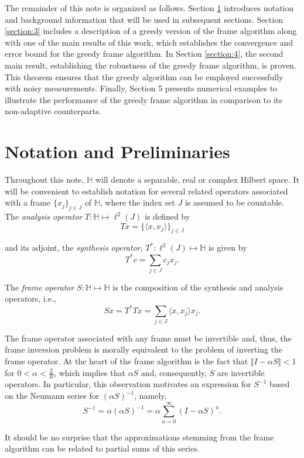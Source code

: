 \documentclass[11pt]{amsart}
\numberwithin{Theorem}{section}
\theoremstyle{definition}
\begin{document}
The remainder of this note is organized as follows.  Section \ref{section:2} introduces notation and background information that will be used in subsequent sections.  Section \ref{section:3} includes a description of a greedy version of the frame algorithm along with one of the main results of this work, which establishes the convergence and error bound for the greedy frame algorithm.  In Section \ref{section:4}, the second main result, establishing the robustness of the greedy frame algorithm, is proven.  This theorem ensures that the greedy algorithm can be employed successfully with noisy measurements.  Finally, Section 5 presents numerical examples to illustrate the performance of the greedy frame algorithm in comparison to its non-adaptive counterparts.


\section{Notation and Preliminaries} \label{section:2}

Throughout this note, $\mathbb{H}$ will denote a separable, real or complex Hilbert space.  It will be convenient to establish notation for several related operators associated with a frame $\lbrace x_{j} \rbrace_{j\in J}$ of $\mathbb{H}$, where the index set $J$ is assumed to be countable.  The \emph{analysis operator} $T:\mathbb{H} \mapsto \ell^{2}(J)$ is defined by
$$ Tx = \lbrace \langle x,x_{j}\rangle \rbrace_{j\in J}$$

\noindent
and its adjoint, the \emph{synthesis operator}, $T^{*}:\ell^{2}(J) \mapsto \mathbb{H}$ is given by
$$ T^{*} c = \sum_{j\in J} c_{j} x_{j}.$$

\noindent
The \emph{frame operator} $S:\mathbb{H} \mapsto \mathbb{H}$ is the composition of the synthesis and analysis operators, i.e.,
$$ S x = T^{*} T x = \sum_{j\in J} \langle x,x_{j} \rangle x_{j}.$$

The frame operator associated with any frame must be invertible and, thus, the frame inversion problem is morally equivalent to the problem of inverting the frame operator.  At the heart of the frame algorithm is the fact that $\Vert I-\alpha S \Vert < 1$ for $0<\alpha < \frac{2}{B}$, which implies that $\alpha S$ and, consequently, $S$ are invertible operators.  In particular, this observation motivates an expression for $S^{-1}$ based on the Neumann series for $(\alpha S)^{-1}$, namely,
$$ S^{-1} = \alpha (\alpha S)^{-1} = \alpha \sum_{n=0}^{\infty} (I-\alpha S)^{n}.$$

\noindent
It should be no surprise that the approximations stemming from the frame algorithm can be related to partial sums of this series.
\end{document}
